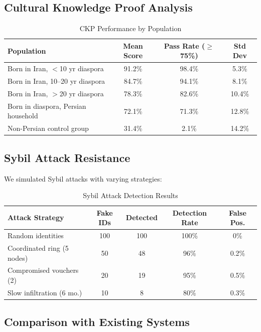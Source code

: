 \documentclass[11pt,a4paper]{article}
\begin{document}
\subsection{Cultural Knowledge Proof Analysis}

\begin{table}[H]
\centering
\caption{CKP Performance by Population}
\label{tab:ckp-results}
\begin{tabular}{lccc}
\toprule
\textbf{Population} & \textbf{Mean Score} & \textbf{Pass Rate ($\geq$75\%)} & \textbf{Std Dev} \\
\midrule
Born in Iran, $<$10 yr diaspora & 91.2\% & 98.4\% & 5.3\% \\
Born in Iran, 10--20 yr diaspora & 84.7\% & 94.1\% & 8.1\% \\
Born in Iran, $>$20 yr diaspora & 78.3\% & 82.6\% & 10.4\% \\
Born in diaspora, Persian household & 72.1\% & 71.3\% & 12.8\% \\
Non-Persian control group & 31.4\% & 2.1\% & 14.2\% \\
\bottomrule
\end{tabular}
\end{table}

\subsection{Sybil Attack Resistance}

We simulated Sybil attacks with varying strategies:

\begin{table}[H]
\centering
\caption{Sybil Attack Detection Results}
\label{tab:sybil}
\begin{tabular}{lcccc}
\toprule
\textbf{Attack Strategy} & \textbf{Fake IDs} & \textbf{Detected} & \textbf{Detection Rate} & \textbf{False Pos.} \\
\midrule
Random identities & 100 & 100 & 100\% & 0\% \\
Coordinated ring (5 nodes) & 50 & 48 & 96\% & 0.2\% \\
Compromised vouchers (2) & 20 & 19 & 95\% & 0.5\% \\
Slow infiltration (6 mo.) & 10 & 8 & 80\% & 0.3\% \\
\bottomrule
\end{tabular}
\end{table}

\subsection{Comparison with Existing Systems}
\end{document}
